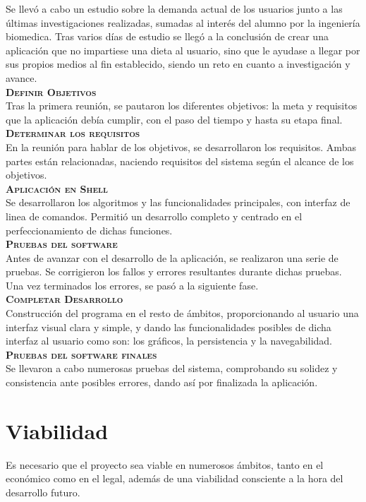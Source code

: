 Se llevó a cabo un estudio sobre la demanda actual de los usuarios junto a las últimas investigaciones realizadas, sumadas al interés del alumno por la ingeniería biomedica. Tras varios días de estudio se llegó a la conclusión de crear una aplicación que no impartiese una dieta al usuario, sino que le ayudase a llegar por sus propios medios al fin establecido, siendo un reto en cuanto a investigación y avance.\\

\textbf{\textsc{Definir Objetivos}}\\
Tras la primera reunión, se pautaron los diferentes objetivos: la meta y requisitos que la aplicación debía cumplir, con el paso del tiempo y hasta su etapa final.\\

\textbf{\textsc{Determinar los requisitos}}\\
En la reunión para hablar de los objetivos, se desarrollaron los requisitos. Ambas partes están relacionadas, naciendo requisitos del sistema según el alcance de los objetivos.\\

\textbf{\textsc{Aplicación en Shell}}\\
Se desarrollaron los algoritmos y las funcionalidades principales, con interfaz de linea de comandos. Permitió un desarrollo completo y centrado en el perfeccionamiento de dichas funciones.\\

\textbf{\textsc{Pruebas del software}}\\
Antes de avanzar con el desarrollo de la aplicación, se realizaron una serie de pruebas. Se corrigieron los fallos y errores resultantes durante dichas pruebas. Una vez terminados los errores, se pasó a la siguiente fase.\\

\textbf{\textsc{Completar Desarrollo}}\\
Construcción del programa en el resto de ámbitos, proporcionando al usuario una interfaz visual clara y simple, y dando las funcionalidades posibles de dicha interfaz al usuario como son:  los gráficos, la persistencia y la navegabilidad.\\

\textbf{\textsc{Pruebas del software finales }}\\
Se llevaron a cabo numerosas pruebas del sistema, comprobando su solidez y consistencia ante posibles errores, dando así por finalizada la aplicación.
\section{Viabilidad}
Es necesario que el proyecto sea viable en numerosos ámbitos, tanto en el económico como en el legal, además de una viabilidad consciente a la hora del desarrollo futuro.
